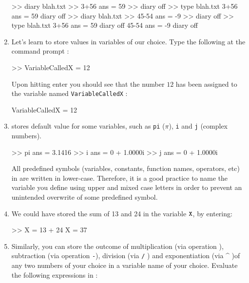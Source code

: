 \begin{labwork}
\begin{enumerate}
{\begin{VrbM}
>> diary blah.txt %
>> 3+56
ans =    59
>> diary off %
>> type blah.txt %
3+56
ans =    59
diary off
>> diary blah.txt %
>> 45-54
ans =    -9
>> diary off %
>> type blah.txt %
3+56
ans =    59
diary off
45-54
ans =    -9
diary off
\end{VrbM}
}
\item{
Let's learn to store values in variables of our choice.  Type the
following at the command prompt :

\begin{VrbM}
>> VariableCalledX = 12
\end{VrbM}

Upon hitting enter you should see that the number $12$ has been assigned to the variable named {\tt VariableCalledX} :
\begin{VrbM}
VariableCalledX =    12
\end{VrbM}
}
\item{
\Matlab stores default value for some variables, such as {\tt pi} ($\pi$), {\tt i} and {\tt j} (complex numbers).
\begin{VrbM}
>> pi
ans =    3.1416
>> i
ans =        0 + 1.0000i
>> j
ans =        0 + 1.0000i
\end{VrbM}
All predefined symbols (variables, constants, function names, operators, etc) in \Matlab are written in lower-case.  Therefore, it is a good practice to name the variable you define using upper and mixed case letters in order to prevent an unintended overwrite of some predefined \Matlab symbol.
}
\item{
We could have stored the sum of 13 and 24 in the variable ${\tt X}$, by entering:
\begin{VrbM}
>> X = 13 + 24
X =    37
\end{VrbM}
}
\item{
Similarly, you can store the outcome of multiplication (via operation {\tt *} ), subtraction
(via operation {\tt -}), division (via {\tt /} ) and exponentiation (via \^{} )of any two numbers of your choice in a variable name of your choice.  Evaluate the following expressions in \Matlab:

}
\end{enumerate}
\end{labwork}
